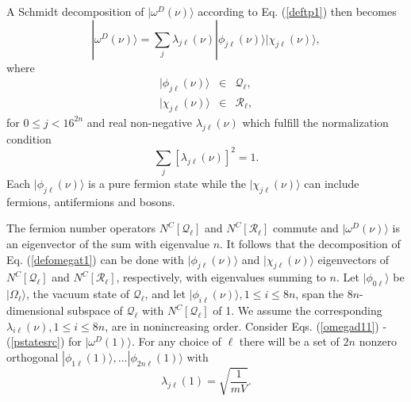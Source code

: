 \documentclass[twocolumn,amsmath,amssymb]{revtex4-1}
\begin{document}
A Schmidt decomposition of $|\omega^D(\nu) \rangle $ according to
Eq. (\ref{deftp1}) then becomes
\begin{equation}
\label{defomegat1}
|\omega^D(\nu) \rangle  =  \sum_j \lambda_{j\ell}(\nu) 
|\phi_{j\ell}(\nu) \rangle |\chi_{j\ell}(\nu) \rangle ,
\end{equation}
where 
\begin{subequations}
\begin{eqnarray}
\label{defphit3}
|\phi_{j\ell}(\nu) \rangle  & \in & \mathcal{Q}_\ell, \\
\label{defchit3}
|\chi_{j\ell}( \nu) \rangle  & \in & \mathcal{R}_\ell,
\end{eqnarray}
\end{subequations}
for $0 \leq j < 16^{2n}$ and real non-negative $\lambda_{j\ell}( \nu)$ which
fulfill the normalization condition
\begin{equation}
\label{normalization1}
\sum_j [ \lambda_{j\ell}( \nu)]^2 =  1.
\end{equation}
Each $|\phi_{j\ell}(\nu) \rangle $ is a pure fermion state while
the $|\chi_{j\ell}(\nu) \rangle $ can include fermions, antifermions and bosons.



The fermion number operators $N^C[\mathcal{Q}_\ell]$ and $N^C[\mathcal{R}_\ell]$ commute and
$|\omega^D(\nu) \rangle $ is an eigenvector of the sum with eigenvalue $n$. It follows that 
the decomposition of Eq. (\ref{defomegat1}) can be done with $|\phi_{j\ell}( \nu) \rangle $ 
and $|\chi_{j\ell}(\nu) \rangle $
eigenvectors of $N^C[\mathcal{Q}_\ell]$ and $N^C[\mathcal{R}_\ell]$, respectively, with
eigenvalues summing to $n$. Let $|\phi_{0\ell} \rangle $ be $|\Omega_\ell \rangle $, the vacuum state
of $\mathcal{Q}_\ell$, and let 
$|\phi_{i\ell} (\nu) \rangle , 1 \le i \le 8n$, 
span the $8n$-dimensional subspace of $\mathcal{Q}_\ell$
with $N^C[\mathcal{Q}_\ell]$ of 1. 
We assume the corresponding $\lambda_{i\ell}( \nu), 1 \le i \le 8n$,
are in nonincreasing order.
Consider Eqs. (\ref{omegad11}) - (\ref{pstatesrc}) for $|\omega^D(1) \rangle $. For any choice
of $\ell$ there will be a set of $2n$ nonzero orthogonal
$|\phi_{1\ell}( 1) \rangle , ... |\phi_{2n\ell}( 1) \rangle $ with 
\begin{equation}
\label{lambda4}
\lambda_{j\ell}( 1) = \sqrt{\frac{1}{mV}}.
\end{equation}
\end{document}
